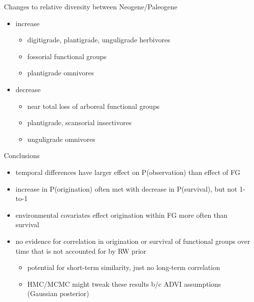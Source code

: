 \documentclass{beamer}
\begin{document}
\begin{frame}
  \begin{block}{Changes to relative diversity between Neogene/Paleogene}
    \begin{itemize}
      \item \alert{increase}
        \begin{itemize}
          \item digitigrade, plantigrade, unguligrade herbivores
          \item fossorial functional groups
          \item plantigrade omnivores
        \end{itemize}
      \item \alert{decrease}
        \begin{itemize}
          \item near total loss of arboreal functional groups
          \item plantigrade, scansorial insectivores
          \item unguligrade omnivores
        \end{itemize}
    \end{itemize}
  \end{block}
\end{frame}

\begin{frame}
  \begin{alertblock}{Conclusions}
    \begin{itemize}
      \item temporal differences have larger effect on P(observation) than effect of FG 
      \item increase in P(origination) often met with decrease in P(survival), but not 1-to-1
      \item environmental covariates effect origination within FG more often than survival
      \item no evidence for correlation in origination or survival of functional groups over time that is not accounted for by RW prior
        \begin{itemize}
          \item potential for short-term similarity, just no long-term correlation
          \item HMC/MCMC might tweak these results b/c ADVI assumptions (Gaussian posterior)
        \end{itemize}
    \end{itemize}
  \end{alertblock}
\end{frame}
\end{document}
